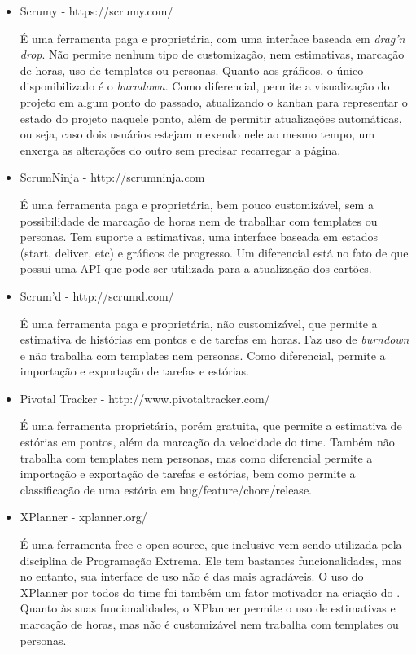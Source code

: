\begin{itemize}
\item{Scrumy - https://scrumy.com/

É uma ferramenta paga e proprietária, com uma interface baseada em \textit{drag'n drop}. Não permite nenhum tipo de
customização, nem estimativas, marcação de horas, uso de templates ou personas. Quanto aos gráficos, o único disponibilizado
é o \textit{burndown}. Como diferencial, permite a visualização do
projeto em algum ponto do passado, atualizando o kanban para representar o estado do projeto naquele ponto, além de
permitir atualizações automáticas, ou seja, caso dois usuários estejam mexendo nele ao mesmo tempo, um enxerga as alterações
do outro sem precisar recarregar a página.}

\item{ScrumNinja - http://scrumninja.com

É uma ferramenta paga e proprietária, bem pouco customizável, sem a possibilidade de marcação de horas nem de
trabalhar com templates ou personas. Tem suporte a estimativas, uma interface baseada em estados (start, deliver, etc) e
gráficos de progresso. Um diferencial está no fato de que possui uma API que pode ser utilizada para a atualização dos
cartões.}

\item{Scrum'd - http://scrumd.com/

É uma ferramenta paga e proprietária, não customizável, que permite a estimativa de histórias em pontos e de tarefas
em horas. Faz uso de \textit{burndown} e não trabalha com templates nem personas. Como diferencial, permite a importação e
exportação de tarefas e estórias.}

\item{Pivotal Tracker - http://www.pivotaltracker.com/

É uma ferramenta proprietária, porém gratuita, que permite a estimativa de estórias em pontos, além da
marcação da velocidade do time. Também não trabalha com templates nem personas, mas como diferencial permite a importação e
exportação de tarefas e estórias, bem como permite a classificação de uma estória em bug/feature/chore/release.}

\item{XPlanner - xplanner.org/

É uma ferramenta free e open source, que inclusive vem sendo utilizada pela disciplina de Programação Extrema.
Ele tem bastantes funcionalidades, mas no entanto, sua interface de uso não é das mais agradáveis. O uso do XPlanner
por todos do time foi também um fator motivador na criação do \calopsita. Quanto às suas funcionalidades, o XPlanner
permite o uso de estimativas e marcação de horas, mas não é customizável nem trabalha com templates ou personas.}


\end{itemize}
